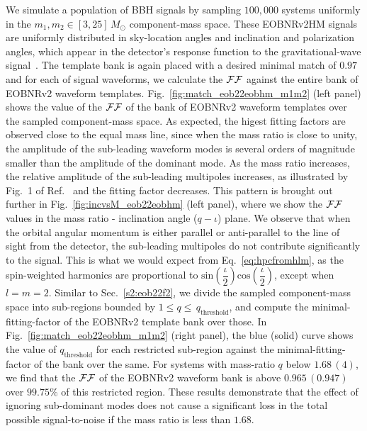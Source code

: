 We simulate a population of BBH signals by sampling $100,000$ systems
uniformly in the $m_1,m_2 \in [3,25] \, M_\odot$ component-mass space. These
EOBNRv2HM signals are uniformly distributed in sky-location angles and
inclination and polarization angles, which appear in the detector's response
function to the gravitational-wave signal~\cite{Sathyaprakash:2009xs}. The 
template bank
is again placed with a desired minimal match of $0.97$ and for each of signal
waveforms, we calculate the $\mathcal{FF}$ against the entire bank of EOBNRv2 waveform
templates.  Fig.~\ref{fig:match_eob22eobhm_m1m2} (left panel) shows the value 
of the $\mathcal{FF}$
of the bank of EOBNRv2 waveform templates over the sampled component-mass 
space. As expected, the higest fitting factors are observed close to the equal mass
line, since when the mass ratio is close to unity, the amplitude of the
sub-leading waveform modes is several orders of magnitude smaller than the
amplitude of the dominant mode. As the mass ratio increases, the relative
amplitude of the sub-leading multipoles increases, as illustrated by Fig.~1 of
Ref.~\cite{BuonannoEOBv2Main} and the fitting factor decreases. This pattern
is brought out further in Fig.~\ref{fig:incvsM_eob22eobhm} (left panel),
where we show the $\mathcal{FF}$ values in the mass ratio - inclination angle 
($q-\iota$) plane. We
observe that when the orbital angular momentum is either parallel or anti-parallel
to the line of sight from the detector, the sub-leading multipoles do not 
contribute significantly to the signal. This is what we would expect from
Eq.~\ref{eq:hpcfromhlm}, as the spin-weighted harmonics are proportional to
$\mathrm{sin}(\dfrac{\iota}{2})\mathrm{cos}(\dfrac{\iota}{2})$, except when
$l=m=2$. Similar to Sec.~\ref{s2:eob22f2}, we divide the sampled component-mass
space into sub-regions bounded by $1\leq q \leq\,q_{\mathrm{threshold}}$, and compute
the minimal-fitting-factor of the EOBNRv2 template bank over those. In
Fig.~\ref{fig:match_eob22eobhm_m1m2} (right panel), the blue (solid) curve shows the 
value of $q_{\mathrm{threshold}}$ for each restricted sub-region against the 
minimal-fitting-factor of the bank over the same. For systems
with mass-ratio $q$ below $1.68\, (4)$, we find that the $\mathcal{FF}$ of the
EOBNRv2 waveform bank is above $0.965\, (0.947)$ over $99.75\%$ of this
restricted region.  These results demonstrate that
the effect of ignoring sub-dominant modes does not cause a significant loss in
the total possible signal-to-noise if the mass ratio is less than $1.68$. 
